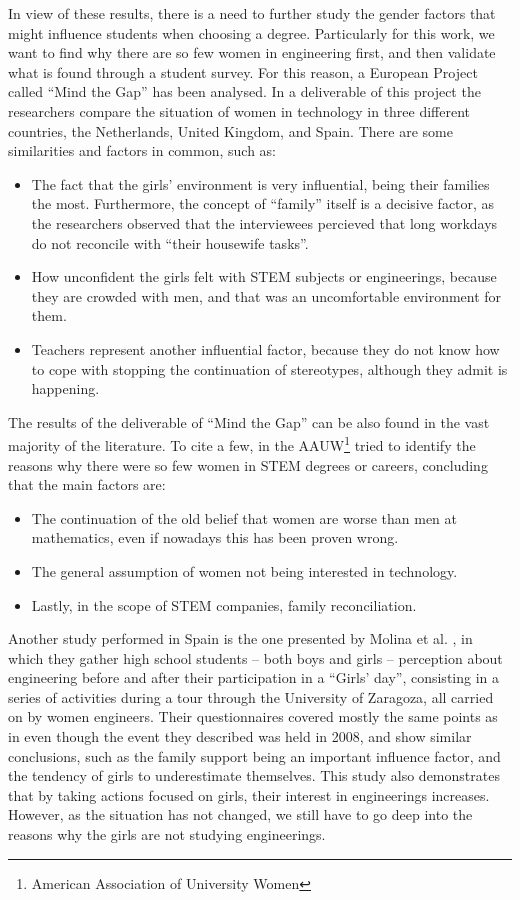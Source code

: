 \documentclass[journal,transmag]{IEEEtran}
\begin{document}
In view of these results, there is a need to further study the gender factors that might influence students when choosing a degree. Particularly for this work, we want to find why there are so few women in engineering first, and then validate what is found through a student survey. For this reason, a European Project called ``Mind the Gap'' has been analysed. In a deliverable of this project \cite{mtg2015} the researchers compare the situation of women in technology in three different countries, the Netherlands, United Kingdom, and Spain.
There are some similarities and factors in common, such as: 
\begin{itemize}
	\item The fact that the girls' environment is very influential, being their families the most. Furthermore, the concept of ``family'' itself is a decisive factor, as the researchers observed that the interviewees percieved that long workdays do not reconcile with ``their housewife tasks''.
	\item How unconfident the girls felt with STEM subjects or engineerings, because they are crowded with men, and that was an uncomfortable environment for them.
	\item Teachers represent another influential factor, because they do not know how to cope with stopping the continuation of stereotypes, although they admit is happening.
\end{itemize}

The results of the deliverable of ``Mind the Gap'' can be also found in the vast majority of the literature. To cite a few, in \cite{hill2010so} the AAUW\footnote{American Association of University Women} tried to identify the reasons why there were so few women in STEM degrees or careers, concluding that the main factors are:

\begin{itemize}
	\item The continuation of the old belief that women are worse than men at mathematics, even if nowadays this has been proven wrong.
	\item The general assumption of women not being interested in technology.
	\item Lastly, in the scope of STEM companies, family reconciliation.
\end{itemize}

Another study performed in Spain is the one presented by Molina et al. \cite{molina2010perception}, in which they gather high school students -- both boys and girls -- perception about engineering before and after their participation in a ``Girls' day'', consisting in a series of activities during a tour through the University of Zaragoza, all carried on by women engineers. Their questionnaires covered mostly the same points as in \cite{everis2012} even though the event they described was held in 2008, and show similar conclusions, such as the family support being an important influence factor, and the tendency of girls to underestimate themselves. This study also demonstrates that by taking actions focused on girls, their interest in engineerings increases. However, as the situation has not changed, we still have to go deep into the reasons why the girls are not studying engineerings.
\end{document}
